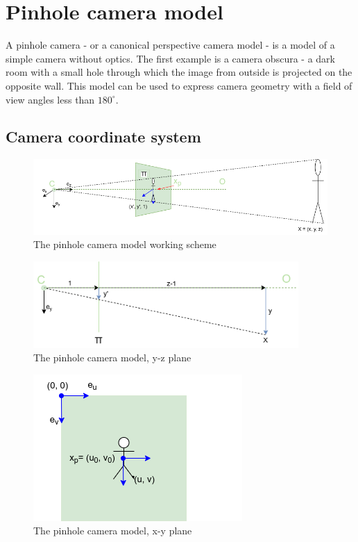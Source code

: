 \section{Pinhole camera model}
A pinhole camera - or a canonical perspective camera model - is a model of a simple camera without optics.
The first example is a camera obscura - a dark room with a small hole through which the image from outside is projected on the opposite wall. 
This model can be used to express camera geometry with a field of view angles less than $180^{\circ}$.

\subsection{Camera coordinate system}
\begin{figure}[h]
    \centering
    \includegraphics[width=1\textwidth]{graphics/td_scene.png}
    \caption{The pinhole camera model working scheme}
    \label{fig:td_scene_3d}
\end{figure}

\begin{figure}[h]
    \centering
    \includegraphics[width=0.9\textwidth]{graphics/td_scene_yz.png}
    \caption{The pinhole camera model, y-z plane}
    \label{fig:td_scene_yz}
\end{figure}

\begin{figure}[h]
    \centering
    \includegraphics[width=.4\textwidth]{graphics/td_scene_xy.png}
    \caption{The pinhole camera model, x-y plane}
    \label{fig:td_scene_xy}
\end{figure}

